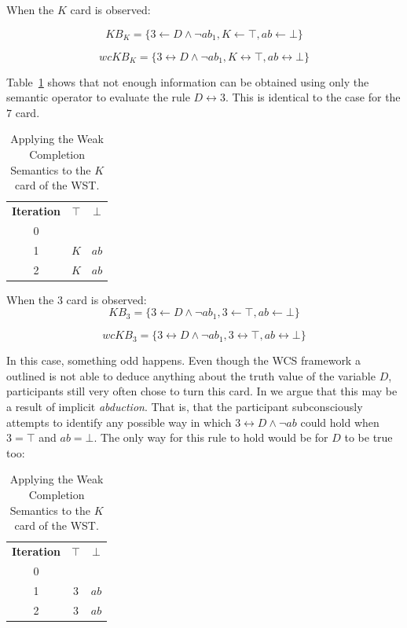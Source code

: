 \documentclass{article}
\begin{document}
When the $K$ card is observed:

\[
KB_K = \{3 \leftarrow D \land \lnot ab_1, K \leftarrow \top, ab \leftarrow \bot \}
\]

\[
wcKB_K = \{3 \leftrightarrow D \land \lnot ab_1, K \leftrightarrow \top, ab \leftrightarrow \bot \}
\]

Table~\ref{tbl:kcard} shows that not enough information can be obtained using only the semantic operator to evaluate the rule $D \leftrightarrow 3$. This is identical to the case for the $7$ card.

\begin{table}
\begin{center}

\begin{tabular}{ c c c }
 \textbf{Iteration} & \textbf{$\top$} & \textbf{$\bot$} \\ 
 0 &  &  \\  
 1 &  $K$ & $ab$  \\  
 2 &  $K$ & $ab$  
\end{tabular}
\caption{Applying the Weak Completion Semantics to the $K$ card of the WST.}
\label{tbl:kcard}

\end{center}
\end{table}

When the $3$ card is observed:
\[
KB_3 = \{3 \leftarrow D \land \lnot ab_1, 3 \leftarrow \top, ab \leftarrow \bot \}
\]

\[
wcKB_3 = \{3 \leftrightarrow D \land \lnot ab_1, 3 \leftrightarrow \top, ab \leftrightarrow \bot \}
\]

In this case, something odd happens. Even though the WCS framework a outlined is not able to deduce anything about the truth value of the variable $D$, participants still very often chose to turn this card. In \cite{breu2019weak} we argue that this may be a result of implicit \textit{abduction}. That is, that the participant subconsciously attempts to identify any possible way in which $3 \leftrightarrow D \land \lnot ab$ could hold when $3=\top$ and $ab=\bot$. The only way for this rule to hold would be for $D$ to be true too:

\begin{table}
\begin{center}

\begin{tabular}{ c c c }
 \textbf{Iteration} & \textbf{$\top$} & \textbf{$\bot$} \\ 
 0 &  &  \\  
 1 &  $3$ & $ab$  \\  
 2 &  $3$ & $ab$  
\end{tabular}
\caption{Applying the Weak Completion Semantics to the $K$ card of the WST.}
\label{tbl:3card}

\end{center}
\end{table}
\end{document}
